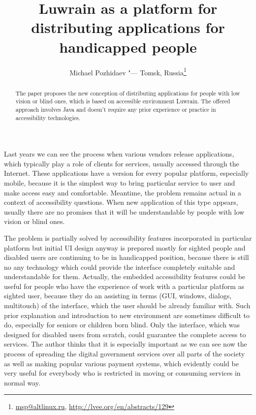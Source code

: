 \documentclass[10pt, a5paper]{article}
\begin{document}
\title{Luwrain as a platform for distributing applications for handicapped people}
\author{Michael Pozhidaev "--- Tomsk, Russia\footnote{\url{msp@altlinux.ru}, \url{http://lvee.org/en/abstracts/129}}}
\maketitle
\begin{abstract}
The paper proposes the new conception of distributing appli\-cations for people with low vision or blind ones, which is based on accessible environment Luwrain. The offered approach involves Java and doesn't require any prior experience or practice in accessibility technologies.
\end{abstract}
Last years we can see the process when various vendors release applica\-tions, which typically play a role of clients for services, usually accessed through the Internet. These applications have a version for every popu\-lar platform, especially mobile, because it is the simplest way to bring particular service to user and make access easy and comfortable. Mean\-time, the problem remains actual in a context of accessibility questions. When new application of this type appears, usually there are no promi\-ses that it will be understandable by people with low vision or blind ones.

The problem is partially solved by accessibility features incorporated in particular platform but initial UI design anyway is prepared mostly for sighted people and disabled users are continuing to be in handicap\-ped position, because there is still no any technology which could provide the interface completely suitable and understandable for them. Actually, the embedded accessibility features could be useful for people who have the experience of work with a particular platform as sighted user, because they do an assisting in terms (GUI, windows, dialogs, multitouch) of the interface, which the user should be already familiar with. Such prior explanation and introduction to new environment are sometimes difficult to do, especially for seniors or children born blind. Only the interface, which was designed for disabled users from scratch, could guarantee the complete access to services. The author thinks that it is especially important as we can see now the process of spreading the digital government services over all parts of the society as well as making popular various payment systems, which evidently could be very useful for everybody who is restricted in moving or consuming services in normal way.
\end{document}
